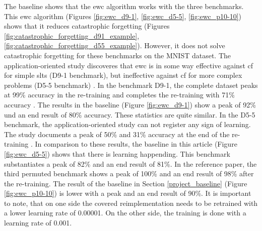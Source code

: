 The baseline shows that the \acrshort{ewc} algorithm works with the three benchmarks.
This \acrshort{ewc} algorithm (Figures \ref{fig:ewc_d9-1}, \ref{fig:ewc_d5-5}, \ref{fig:ewc_p10-10}) shows that it reduces catastrophic forgetting (Figures \ref{fig:catastrophic_forgetting_d91_example}, \ref{fig:catastrophic_forgetting_d55_example}).
However, it does not solve catastrophic forgetting for these benchmarks on the MNIST dataset.
\newline
The application-oriented study \cite{cf_application_oriented_study} discoveres that \acrshort{ewc} is in some way effective against \acrlong{cf} for simple \acrshort{slt}s (D9-1 benchmark), but ineffective against \acrlong{cf} for more complex problems (D5-5 benchmark) \cite{cf_application_oriented_study}.
\newline
In the benchmark D9-1, the complete dataset peaks at 99\% accuracy in the re-training and completes the re-training with 71\% accuracy \cite{cf_application_oriented_study}.
The results in the baseline (Figure \ref{fig:ewc_d9-1}) show a peak of 92\% und an end result of 80\% accuracy.
These statistics are quite similar.
\newline
In the D5-5 benchmark, the application-oriented study can not register any sign of learning.
The study documents a peak of 50\% and 31\% accuracy at the end of the re-training \cite{cf_application_oriented_study}.
In comparison to these results, the baseline in this article (Figure \ref{fig:ewc_d5-5}) shows that there is learning happending.
This benchmark substantiates a peak of 82\% and an end result of 81\%.
\newline
In the reference paper, the third permuted benchmark \cite{cf_application_oriented_study} shows a peak of 100\% and an end result of 98\% after the re-training.
The result of the baseline in Section \ref{project_baseline} (Figure \ref{fig:ewc_p10-10}) is lower with a peak and an end result of 90\%.
\newline
It is important to note, that on one side the covered reimplementation needs to be retrained with a lower learning rate of 0.00001.
On the other side, the training is done with a learning rate of 0.001.

